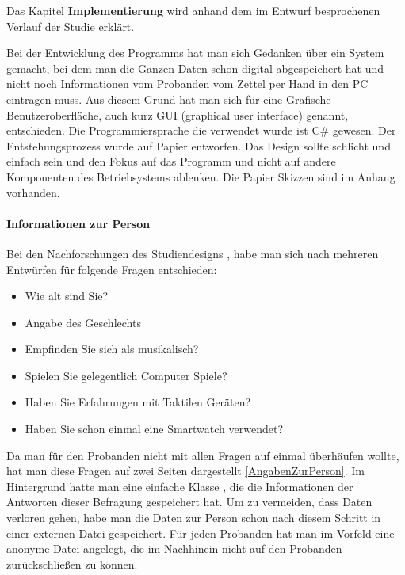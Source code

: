 
Das Kapitel \textbf{Implementierung} wird anhand dem im Entwurf besprochenen Verlauf der Studie erkl{\"a}rt.

Bei der Entwicklung des Programms hat man sich Gedanken {\"u}ber ein System gemacht, bei dem man die Ganzen Daten schon digital abgespeichert hat und nicht noch Informationen vom Probanden vom Zettel per Hand in den PC eintragen muss. Aus diesem Grund hat man sich f{\"u}r eine Grafische Benutzeroberfl{\"a}che, auch kurz GUI (graphical user interface) genannt, entschieden. 
Die Programmiersprache die verwendet wurde ist C\# gewesen.
Der Entstehungsprozess wurde auf Papier entworfen. Das Design sollte schlicht und einfach sein und den Fokus auf das Programm und nicht auf andere Komponenten des Betriebsystems ablenken. Die Papier Skizzen sind im Anhang vorhanden.

\paragraph{Informationen zur Person}
Bei den Nachforschungen des Studiendesigns \cite{benyon2005designing}, habe man sich nach mehreren Entw{\"u}rfen f{\"u}r folgende Fragen entschieden:

\begin{itemize}
\item Wie alt sind Sie?
\item Angabe des Geschlechts
\item Empfinden Sie sich als musikalisch? 
\item Spielen Sie gelegentlich Computer Spiele?
\item Haben Sie Erfahrungen mit Taktilen Ger{\"a}ten?
\item Haben Sie schon einmal eine Smartwatch verwendet?
\end{itemize}

Da man f{\"u}r den Probanden nicht mit allen Fragen auf einmal {\"u}berh{\"a}ufen wollte, hat man diese Fragen auf zwei Seiten dargestellt \autoref{AngabenZurPerson}. Im Hintergrund hatte man eine einfache Klasse , die die Informationen der Antworten dieser Befragung gespeichert hat. Um zu vermeiden, dass Daten verloren gehen, habe man die Daten zur Person schon nach diesem Schritt in einer externen Datei gespeichert. F{\"u}r jeden Probanden hat man im Vorfeld eine anonyme Datei angelegt, die im Nachhinein nicht auf den Probanden zur{\"u}ckschlie{\ss}en zu k{\"o}nnen.  

